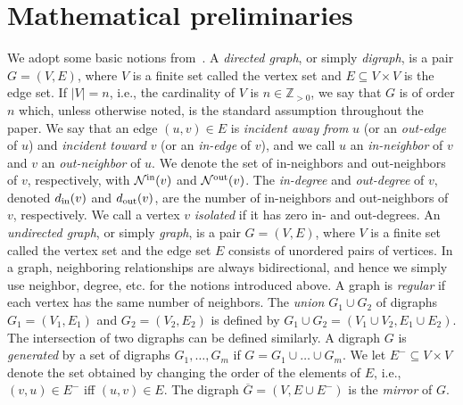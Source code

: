 \documentclass[final]{siamltex}
\begin{document}
\section{Mathematical preliminaries} \label{section:mathematical_p}

We adopt some basic notions from~\cite{FB-JC-SM:08cor,RD:05,NB:94}.  A
\emph{directed graph}, or simply \emph{digraph}, is a pair $G=(V,E)$,
where $V$ is a finite set called the vertex set and $ E \subseteq
V\times V $ is the edge set.  If $|V|=n$, i.e., the cardinality of $V$
is $ n\in \mathbb{Z}_{>0}$, we say that $G$ is of order $n$ which,
unless otherwise noted, is the standard assumption throughout the
paper.  We say that an edge $ (u,v) \in E $ is \emph{incident away
  from} $u$ (or an \emph{out-edge} of $ u $) and \emph{incident
  toward} $v$ (or an \emph{in-edge} of $ v $), and we call $ u $ an
\emph{in-neighbor} of $ v $ and $ v $ an \emph{out-neighbor} of $ u $.
We denote the set of in-neighbors and out-neighbors of $ v $,
respectively, with $ {{\mathcal{N}}^{\textup{{in}}}}(v) $ and $
{{\mathcal{N}}^{\textup{{out}}}}(v) $. The \emph{in-degree} and
\emph{out-degree} of $v$, denoted ${{{d}_{\textup{{in}}}}}(v)$ and ${{{d}_{\textup{{out}}}}}(v)$, are the
number of in-neighbors and out-neighbors of $v$, respectively.  We
call a vertex $ v $ \emph{isolated} if it has zero in- and
out-degrees.  An \emph{undirected graph}, or simply \emph{graph}, is a
pair $G=(V,E)$, where $V$ is a finite set called the vertex set and
the edge set $E$ consists of unordered pairs of vertices. In a graph,
neighboring relationships are always bidirectional, and hence we
simply use neighbor, degree, etc. for the notions introduced above.  A
graph is \emph{regular} if each vertex has the same number of
neighbors. 
The
\emph{union} $G_1\cup G_2 $ of digraphs $ G_1=(V_1,E_1) $ and $
G_2=(V_2,E_2) $ is defined by $G_1\cup G_2=(V_1\cup V_2, E_1\cup
E_2)$.  The intersection of two digraphs can be defined similarly.  A
digraph $G$ is \emph{generated} by a set of digraphs $G_1, \dots, G_m$
if $ G=G_1\cup \dots \cup G_m $.  We let $ E^{-} \subseteq V\times V $
denote the set obtained by changing the order of the elements of $ E
$, i.e., $(v,u)\in E^{-}$ iff $ (u,v) \in E $.  The digraph
$\overline{G}=(V,E \cup E^{-})$ is the \emph{mirror} of $G$.
\end{document}
